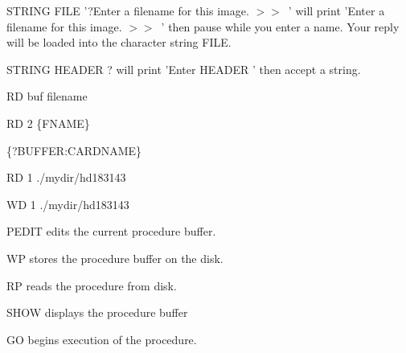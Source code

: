 {\newpage\clearpage
{}%
\begin{example}
  \item[STRING FILE '?Enter a filename for this image. $>>$\  '\hfill]{ will
   print 'Enter a filename for this image. $>>$\  ' then pause while you
   enter a name.  Your reply will be loaded into the character string
   FILE.}
\par\item[STRING HEADER ?\hfill]{ will print 'Enter HEADER ' then accept a
        string.}
\end{example}%
\lthtmlfigureZ
\lthtmlcheckvsize\clearpage}

{\newpage\clearpage
{}%
\begin{hanging}
  \item{RD buf filename}
\end{hanging}%
\lthtmlfigureZ
\lthtmlcheckvsize\clearpage}

{\newpage\clearpage
{}%
\begin{hanging}
  \item{RD 2 \{FNAME\}}
\end{hanging}%
\lthtmlfigureZ
\lthtmlcheckvsize\clearpage}

{\newpage\clearpage
{}%
\begin{hanging}
  \item{\{?BUFFER:CARDNAME\}}
\end{hanging}%
\lthtmlfigureZ
\lthtmlcheckvsize\clearpage}

{\newpage\clearpage
{}%
\begin{hanging}
    \item {RD 1 ./mydir/hd183143}
  \end{hanging}%
\lthtmlfigureZ
\lthtmlcheckvsize\clearpage}

{\newpage\clearpage
{}%
\begin{hanging}
    \item {WD 1 ./mydir/hd183143}
  \end{hanging}%
\lthtmlfigureZ
\lthtmlcheckvsize\clearpage}

{\newpage\clearpage
{}%
\begin{example}
  \item[PEDIT\hfill]{edits the current procedure buffer.}
  \item[WP\hfill]{stores the procedure buffer on the disk.}
  \item[RP\hfill]{reads the procedure from disk.}
  \item[SHOW\hfill]{displays the procedure buffer}
  \item[GO\hfill]{begins execution of the procedure.}
\end{example}%
\lthtmlfigureZ
\lthtmlcheckvsize\clearpage}

